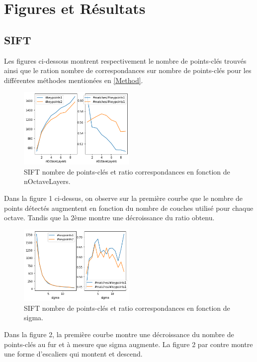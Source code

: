 \documentclass[conference]{IEEEtran}
\begin{document}
\section{Figures et Résultats}

\subsection{SIFT}

Les figures ci-dessous montrent respectivement le nombre de points-clés trouvés ainsi que le ration nombre de correspondances sur nombre de points-clés pour les différentes méthodes mentionées en \ref{Method}. 

\begin{figure}[ht]
\centerline{\includegraphics[width=0.5\textwidth]{fig1.png}}
\caption{SIFT nombre de points-clés et ratio correspondances en fonction de nOctaveLayers.}
\label{fig}
\end{figure}

Dans la figure 1 ci-dessus, on observe sur la première courbe que le nombre de points détectés augmentent en fonction du nombre de couches utilisé pour chaque octave. Tandis que la 2ème montre une décroissance du ratio obtenu.

\begin{figure}[ht]
\centerline{\includegraphics[width=0.5\textwidth]{fig2.png}}
\caption{SIFT nombre de points-clés et ratio correspondances en fonction de sigma.}
\label{fig}
\end{figure}

Dans la figure 2, la première courbe montre une décroissance du nombre de points-clés au fur et à mesure que sigma augmente.  La figure 2 par contre montre une forme d'escaliers qui montent et descend. \\
\end{document}
